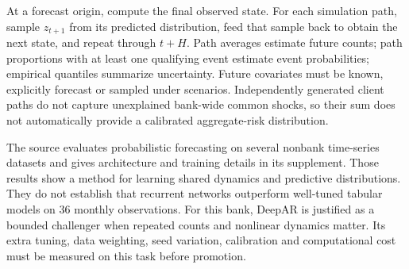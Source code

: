 At a forecast origin, compute the final observed state. For each simulation path, sample $z_{t+1}$ from its predicted distribution, feed that sample back to obtain the next state, and repeat through $t+H$. Path averages estimate future counts; path proportions with at least one qualifying event estimate event probabilities; empirical quantiles summarize uncertainty. Future covariates must be known, explicitly forecast or sampled under scenarios. Independently generated client paths do not capture unexplained bank-wide common shocks, so their sum does not automatically provide a calibrated aggregate-risk distribution.

The source evaluates probabilistic forecasting on several nonbank time-series datasets and gives architecture and training details in its supplement. Those results show a method for learning shared dynamics and predictive distributions. They do not establish that recurrent networks outperform well-tuned tabular models on 36 monthly observations. For this bank, DeepAR is justified as a bounded challenger when repeated counts and nonlinear dynamics matter. Its extra tuning, data weighting, seed variation, calibration and computational cost must be measured on this task before promotion.
